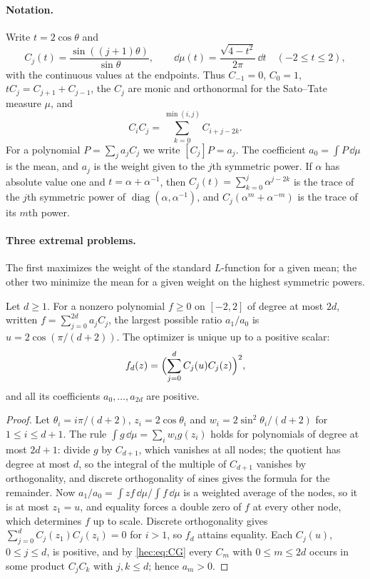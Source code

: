 \paragraph{Notation.}
Write $t=2\cos\theta$ and
\[
 C_j(t)=\frac{\sin((j+1)\theta)}{\sin\theta},\qquad
 \dd\mu(t)=\frac{\sqrt{4-t^2}}{2\pi}\,\dd t\quad(-2\le t\le2),
\]
with the continuous values at the endpoints. Thus $C_{-1}=0$, $C_0=1$, $tC_j=C_{j+1}+C_{j-1}$, the $C_j$
are monic and orthonormal for the Sato--Tate measure $\mu$, and
\begin{equation}\label{hec:eq:CG}
 C_iC_j=\sum_{k=0}^{\min(i,j)}C_{i+j-2k}.
\end{equation}
For a polynomial $P=\sum_ja_jC_j$ we write $[C_j]P=a_j$. The coefficient $a_0=\int P\,\dd\mu$ is the mean,
and $a_j$ is the weight given to the $j$th symmetric power. If $\alpha$ has absolute value one and
$t=\alpha+\alpha^{-1}$, then $C_j(t)=\sum_{k=0}^j\alpha^{j-2k}$ is the trace of the $j$th symmetric power
of $\operatorname{diag}(\alpha,\alpha^{-1})$, and $C_j(\alpha^m+\alpha^{-m})$ is the trace of its $m$th
power.

\paragraph{Three extremal problems.}
The first maximizes the weight of the standard $L$-function for a given mean; the other two minimize the
mean for a given weight on the highest symmetric powers.

\begin{proposition}\label{hec:prop:extrE}
Let $d\ge1$. For a nonzero polynomial $f\ge0$ on $[-2,2]$ of degree at most $2d$, written
$f=\sum_{j=0}^{2d}a_jC_j$, the largest possible ratio $a_1/a_0$ is $u=2\cos(\pi/(d+2))$. The optimizer is
unique up to a positive scalar:
\[
 f_d(z)=\Bigl(\sum_{j=0}^dC_j(u)C_j(z)\Bigr)^2 ,
\]
and all its coefficients $a_0,\dots,a_{2d}$ are positive.
\end{proposition}

\begin{proof}
Let $\theta_i=i\pi/(d+2)$, $z_i=2\cos\theta_i$ and $w_i=2\sin^2\theta_i/(d+2)$ for $1\le i\le d+1$. The rule
$\int g\,\dd\mu=\sum_iw_ig(z_i)$ holds for polynomials of degree at most $2d+1$: divide $g$ by $C_{d+1}$,
which vanishes at all nodes; the quotient has degree at most $d$, so the integral of the multiple of
$C_{d+1}$ vanishes by orthogonality, and discrete orthogonality of sines gives the formula for the
remainder. Now $a_1/a_0=\int zf\,\dd\mu/\int f\,\dd\mu$ is a weighted average of the nodes, so it is at
most $z_1=u$, and equality forces a double zero of $f$ at every other node, which determines $f$ up to
scale. Discrete orthogonality gives $\sum_{j=0}^dC_j(z_1)C_j(z_i)=0$ for $i>1$, so $f_d$ attains equality.
Each $C_j(u)$, $0\le j\le d$, is positive, and by \eqref{hec:eq:CG} every $C_m$ with $0\le m\le2d$ occurs in
some product $C_jC_k$ with $j,k\le d$; hence $a_m>0$.
\end{proof}

